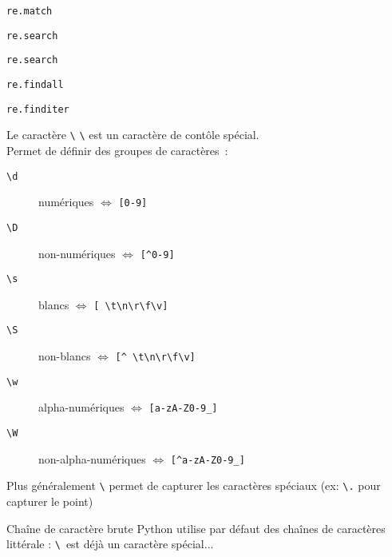 \begin{frame}{\texttt{re.match}}
\end{frame}

\begin{frame}{\texttt{re.search}}
\end{frame}

\begin{frame}{\texttt{re.search}}
\end{frame}

\begin{frame}{\texttt{re.findall}}
\end{frame}

\begin{frame}{\texttt{re.finditer}}
\end{frame}

\begin{frame}{Le caractère \texttt{\textbackslash}}
  \texttt{\textbackslash} est un caractère de contôle spécial. \\
  Permet de définir des groupes de caractères~:
  \begin{description}
  \item[\texttt{\textbackslash d}] numériques $\iff$ \texttt{[0-9]}
  \item[\texttt{\textbackslash D}] non-numériques $\iff$ \texttt{[\^{}0-9]}
  \item[\texttt{\textbackslash s}] blancs $\iff$ \texttt{[ \textbackslash t\textbackslash n\textbackslash r\textbackslash f\textbackslash v]}
  \item[\texttt{\textbackslash S}] non-blancs $\iff$ \texttt{[\^{} \textbackslash t\textbackslash n\textbackslash r\textbackslash f\textbackslash v]}
  \item[\texttt{\textbackslash w}] alpha-numériques $\iff$ \texttt{[a-zA-Z0-9\_]}
  \item[\texttt{\textbackslash W}] non-alpha-numériques $\iff$ \texttt{[\^{}a-zA-Z0-9\_]}
  \end{description}
  Plus généralement \texttt{\textbackslash} permet de capturer les caractères spéciaux (ex: \texttt{\textbackslash .} pour capturer le point)
\end{frame}

\begin{frame}{Chaîne de caractère brute}
  Python utilise par défaut des chaînes de caractères littérale : \texttt{\textbackslash} est déjà un caractère spécial...
\end{frame}

